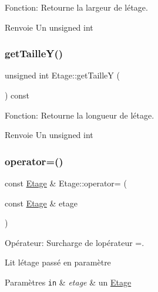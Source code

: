 Fonction\+: Retourne la largeur de l\textquotesingle{}étage. 

\begin{DoxyReturn}{Renvoie}
Un unsigned int 
\end{DoxyReturn}
\mbox{\label{classEtage_aedda7013ef98a6f05c717361ea684724}} 
\subsubsection{\texorpdfstring{get\+Taille\+Y()}{getTailleY()}}
{\footnotesize\ttfamily unsigned int Etage\+::get\+TailleY (\begin{DoxyParamCaption}{ }\end{DoxyParamCaption}) const}



Fonction\+: Retourne la longueur de l\textquotesingle{}étage. 

\begin{DoxyReturn}{Renvoie}
Un unsigned int 
\end{DoxyReturn}
\mbox{\label{classEtage_abc5f691a5a4dd0fd15e308ade202783f}} 
\subsubsection{\texorpdfstring{operator=()}{operator=()}}
{\footnotesize\ttfamily const \mbox{\hyperlink{classEtage}{Etage}} \& Etage\+::operator= (\begin{DoxyParamCaption}\item[{const \mbox{\hyperlink{classEtage}{Etage}} \&}]{etage }\end{DoxyParamCaption})}



Opérateur\+: Surcharge de l\textquotesingle{}opérateur =. 

Lit l\textquotesingle{}étage passé en paramètre 
\begin{DoxyParams}[1]{Paramètres}
\mbox{\tt in}  & {\em etage} & un \mbox{\hyperlink{classEtage}{Etage}} \\
\hline
\end{DoxyParams}
\mbox{\label{classEtage_a68d7621769f9c9668a33f7b56ca7a092}} 
